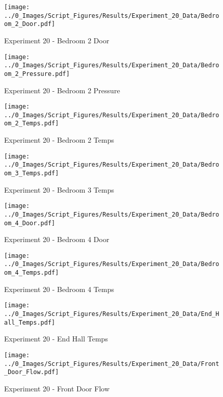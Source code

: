 	\begin{figure}[H]
		\centering
		\texttt{[image: ../0\_Images/Script\_Figures/Results/Experiment\_20\_Data/Bedroom\_2\_Door.pdf]}
		\caption[]{Experiment 20 - Bedroom 2 Door}
	\end{figure}
 
	\clearpage

	\begin{figure}[H]
		\centering
		\texttt{[image: ../0\_Images/Script\_Figures/Results/Experiment\_20\_Data/Bedroom\_2\_Pressure.pdf]}
		\caption[]{Experiment 20 - Bedroom 2 Pressure}
	\end{figure}
 

	\begin{figure}[H]
		\centering
		\texttt{[image: ../0\_Images/Script\_Figures/Results/Experiment\_20\_Data/Bedroom\_2\_Temps.pdf]}
		\caption[]{Experiment 20 - Bedroom 2 Temps}
	\end{figure}
 
	\clearpage

	\begin{figure}[H]
		\centering
		\texttt{[image: ../0\_Images/Script\_Figures/Results/Experiment\_20\_Data/Bedroom\_3\_Temps.pdf]}
		\caption[]{Experiment 20 - Bedroom 3 Temps}
	\end{figure}
 

	\begin{figure}[H]
		\centering
		\texttt{[image: ../0\_Images/Script\_Figures/Results/Experiment\_20\_Data/Bedroom\_4\_Door.pdf]}
		\caption[]{Experiment 20 - Bedroom 4 Door}
	\end{figure}
 
	\clearpage

	\begin{figure}[H]
		\centering
		\texttt{[image: ../0\_Images/Script\_Figures/Results/Experiment\_20\_Data/Bedroom\_4\_Temps.pdf]}
		\caption[]{Experiment 20 - Bedroom 4 Temps}
	\end{figure}
 

	\begin{figure}[H]
		\centering
		\texttt{[image: ../0\_Images/Script\_Figures/Results/Experiment\_20\_Data/End\_Hall\_Temps.pdf]}
		\caption[]{Experiment 20 - End Hall Temps}
	\end{figure}
 
	\clearpage

	\begin{figure}[H]
		\centering
		\texttt{[image: ../0\_Images/Script\_Figures/Results/Experiment\_20\_Data/Front\_Door\_Flow.pdf]}
		\caption[]{Experiment 20 - Front Door Flow}
	\end{figure}
 

